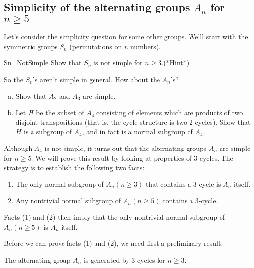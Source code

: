 {\subsection{Simplicity of the alternating groups $A_n$ for $n \ge 5$}
Let's consider the simplicity question for some other groups. We'll start with the symmetric groups $S_n$ (permutations on $n$ numbers).

\begin{exercise}{Sn_NotSimple}
Show that $S_n$ is not simple for $n \geq 3$.\hyperref[sec:cosets:hints]{(*Hint*)}
\end{exercise}

So the $S_n$'s aren't simple in general.  How about the $A_n$'s?

\begin{exercise}{}
\begin{enumerate}[(a)]
\item
Show that $A_2$ and $A_3$ are simple.
\item
Let $H$ be the subset of $A_4$ consisting of elements which are products of two disjoint  transpositions (that is, the cycle structure is two 2-cycles). Show that $H$ is a subgroup of $A_4$, and in fact is a normal subgroup of $A_4$.
\end{enumerate}
\end{exercise}

Although $A_4$ is not simple, it turns out that the alternating groups $A_n$ are simple for
$n \geq 5$. We will prove this result by looking at properties of 3-cycles. The strategy is to establish the following two facts:
\begin{enumerate}[(1)]
\item
The only  normal subgroup of $A_n (n \geq 3)$ that contains a 3-cycle is $A_n$ itself.
\item
Any nontrivial normal subgroup of $A_n (n \geq 5)$ contains a 3-cycle.
\end{enumerate}
Facts (1) and (2) then imply that the only nontrivial normal subgroup of $A_n (n \geq 5)$ is $A_n$ itself.

Before we can prove facts (1) and (2), we need first a preliminary result: 

\begin{thm}\label{normal:3cycle_lemma1}
The alternating group $A_n$ is generated by $3$-cycles for $n \geq 3$.
\end{thm}
 
}
